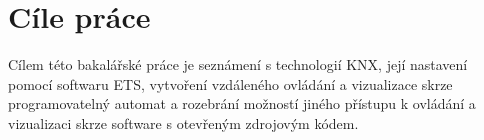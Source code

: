 \chapter*{Cíle práce}
{}

Cílem této bakalářské práce je seznámení s technologií KNX, její nastavení pomocí softwaru ETS, vytvoření vzdáleného ovládání a vizualizace skrze programovatelný automat a rozebrání možností jiného přístupu k ovládání a vizualizaci skrze software s otevřeným zdrojovým kódem. 
